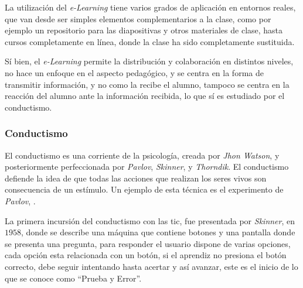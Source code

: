 La utilización del \emph{e-Learning} tiene varios grados de aplicación en
entornos reales\cite{punie:ict}, que van desde ser simples elementos
complementarios a la clase, como por ejemplo un repositorio para las
diapositivas y otros materiales de clase, hasta cursos completamente en línea,
donde la clase ha sido completamente sustituida.

Sí bien, el \emph{e-Learning} permite la distribución y colaboración en
distintos niveles, no hace un enfoque en el aspecto pedagógico, y se centra en
la forma de transmitir información, y no como la recibe el
alumno\cite{leinonen:ict}, tampoco se centra en la reacción del alumno ante la
información recibida, lo que sí es estudiado por el
conductismo\cite{weegar2012comparison}.

\subsubsection{Conductismo}

El conductismo es una corriente de la psicología, creada por \textit{Jhon
    Watson}, y posteriormente perfeccionada por \textit{Pavlov},
\textit{Skinner}, y \textit{Thorndik}. El conductismo defiende la idea de que
todas las acciones que realizan los seres vivos son consecuencia de un
estímulo. Un ejemplo de esta técnica es el experimento de \textit{Pavlov},
\cite{weegar2012comparison}.


La primera incursión del conductismo con las \Gls{tic}, fue presentada por
\textit{Skinner}, en $1958$\cite{weegar2012comparison}, donde se describe una
máquina que contiene botones y una pantalla donde se presenta una pregunta,
para responder el usuario dispone de varias opciones, cada opción esta
relacionada con un botón, si el aprendiz no presiona el botón correcto, debe
seguir intentando hasta acertar y así avanzar\cite{weegar2012comparison}, este
es el inicio de lo que se conoce como \enquote{Prueba y Error}.

